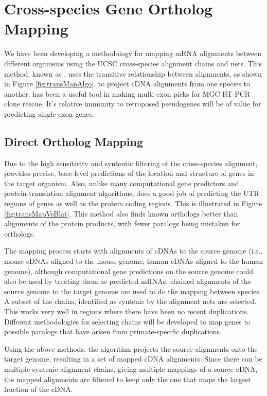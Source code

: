 \section{Cross-species Gene Ortholog Mapping}
\label{sec:transMap}

We have been developing a methodology for mapping mRNA alignments
between different organisms using the UCSC cross-species alignment
chains and nets. This method, known as \TransMap, uses the
transitive relationship between alignments, as shown in Figure
\ref{fig:transMapAlgo}, to project cDNA alignments from one species
to another. \TransMap has been a useful tool in making multi-exon
picks for MGC RT-PCR clone rescue.  It's relative immunity to
retroposed pseudogenes will be of value for predicting single-exon
genes.

\subsection*{Direct Ortholog Mapping}
Due to the high sensitivity and syntentic filtering of the
cross-species alignment, \TransMap provides precise, base-level
predictions of the location and structure of genes in the target
organism.  Also, unlike many computational gene predictors and
protein-translation alignment algorithms, \TransMap does a good job
of predicting the UTR regions of genes as well as the protein coding
regions.  This is illustrated in Figure \ref{fig:transMapVsBlat}.
This method also finds known orthologs better than \BLASTP
alignments of the protein products, with fewer paralogs being
mistaken for orthologs.

The mapping process starts with alignments of cDNAs to the source
genome (i.e., mouse cDNAs aligned to the mouse genome, human cDNAs
aligned to the human genome), although computational gene predictions
on the source genome could also be used by treating them as
predicted mRNAs. \BLASTZ \cite{SCHWETAL03} chained
alignments \cite{KENTETAL03} of the source genome to the target
genome are used to do the mapping between species.  A subset of the
chains, identified as syntenic by the alignment
nets \cite{KENTETAL03} are selected.  This works very well in regions
where there have been no recent duplications.  Different
methodologies for selecting chains will be developed to map genes to
possible paralogs that have arisen from primate-specific
duplications.

Using the above methods, the \TransMap algorithm projects the source
alignments onto the target genome, resulting in a set of mapped cDNA
alignments. Since there can be multiple syntenic alignment chains,
giving multiple mappings of a source cDNA, the mapped alignments are
filtered to keep only the one that maps the largest fraction of
the cDNA.

